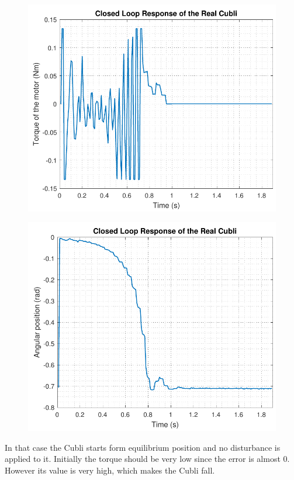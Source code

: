 \begin{minipage}{0.45\linewidth}
	\begin{figure}[H]
		\centering
		\includegraphics[scale=.53]{figures/torqueTestTustinPre}
		\captionsetup{justification=centering}
		\label{torqueTustinPre}
	\end{figure}\vspace{-5mm}
\end{minipage}
\hspace{0.03\linewidth}
\begin{minipage}{0.45\linewidth}
	\begin{figure}[H]\vspace{-0mm}
		\centering
		\includegraphics[scale=.53]{figures/positionTestTustinPre}
		\captionsetup{justification=centering}
		\label{positionTustinPre}
	\end{figure}\vspace{-5mm}
\end{minipage}

 In that case the Cubli starts form equilibrium position and no disturbance is applied to it. Initially the torque should be very low since the error is almost 0. However its value is very high, which makes
 the Cubli fall. 
 

